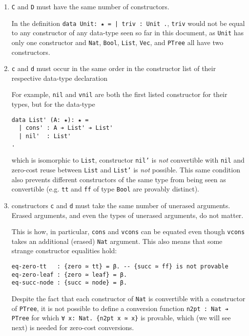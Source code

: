 \documentclass{article}
\begin{document}
\begin{enumerate}
\item \texttt{C} and \texttt{D} must have the same number of constructors.

  In the definition \texttt{data Unit: ★ = | triv : Unit .}, \texttt{triv} would
  not be equal to any constructor of any data-type seen so far in this document,
  as \texttt{Unit} has only one constructor and \texttt{Nat}, \texttt{Bool},
  \texttt{List}, \texttt{Vec}, and \texttt{PTree} all have two constructors.

\item \texttt{c} and \texttt{d} must occur in the same order in the constructor
  list of their respective data-type declaration

  For example, \texttt{nil} and \texttt{vnil} are both the first listed
  constructor for their types, but for the data-type
\begin{verbatim}
data List' (A: ★): ★ =
  | cons' : A ➔ List' ➔ List'
  | nil'  : List'
.
\end{verbatim}
\noindent which is isomorphic to \texttt{List}, constructor \texttt{nil'} is
\textit{not} convertible with \texttt{nil} and zero-cost reuse between
\texttt{List} and \texttt{List'} is \textit{not} possible. This same condition also
prevents different constructors of the same type from being seen as convertible
(e.g. \texttt{tt} and \texttt{ff} of type \texttt{Bool} are provably distinct).

\item constructors \texttt{c} and \texttt{d} must take the same number of
  unerased arguments. Erased arguments, and even the types of unerased
  arguments, do not matter.

  This is how, in particular, \texttt{cons} and \texttt{vcons} can be equated
  even though \texttt{vcons} takes an additional (erased) \texttt{Nat} argument.
  This also means that some strange constructor equalities hold:

\begin{verbatim}
eq-zero-tt   : {zero ≃ tt} = β. -- {succ ≃ ff} is not provable
eq-zero-leaf : {zero ≃ leaf} = β. 
eq-succ-node : {succ ≃ node} = β.
\end{verbatim}

  Despite the fact that each constructor of \texttt{Nat} is convertible with a
  constructor of \texttt{PTree}, it is not possible to define a conversion
  function \texttt{n2pt : Nat ➔ PTree} for which \texttt{∀ x: Nat. \{n2pt x ≃
    x\}} is provable, which (we will see next) is needed for zero-cost conversions.
\end{enumerate}
\end{document}
